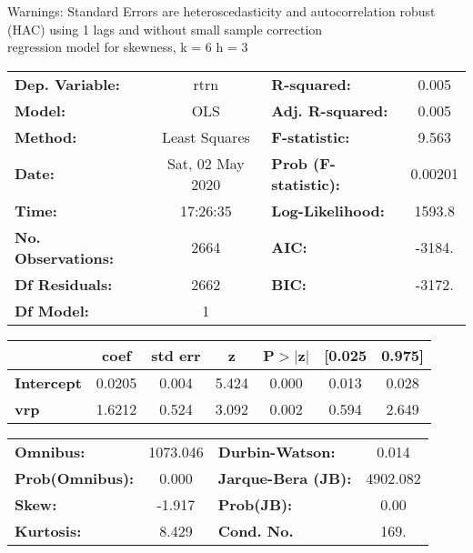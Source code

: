 Warnings: \newline
 [1] Standard Errors are heteroscedasticity and autocorrelation robust (HAC) using 1 lags and without small sample correction\\ 

regression model for skewness, k = 6 h = 3\begin{center}
\begin{tabular}{lclc}
\toprule
\textbf{Dep. Variable:}    &       rtrn       & \textbf{  R-squared:         } &     0.005   \\
\textbf{Model:}            &       OLS        & \textbf{  Adj. R-squared:    } &     0.005   \\
\textbf{Method:}           &  Least Squares   & \textbf{  F-statistic:       } &     9.563   \\
\textbf{Date:}             & Sat, 02 May 2020 & \textbf{  Prob (F-statistic):} &  0.00201    \\
\textbf{Time:}             &     17:26:35     & \textbf{  Log-Likelihood:    } &    1593.8   \\
\textbf{No. Observations:} &        2664      & \textbf{  AIC:               } &    -3184.   \\
\textbf{Df Residuals:}     &        2662      & \textbf{  BIC:               } &    -3172.   \\
\textbf{Df Model:}         &           1      & \textbf{                     } &             \\
\bottomrule
\end{tabular}
\begin{tabular}{lcccccc}
                   & \textbf{coef} & \textbf{std err} & \textbf{z} & \textbf{P$> |$z$|$} & \textbf{[0.025} & \textbf{0.975]}  \\
\midrule
\textbf{Intercept} &       0.0205  &        0.004     &     5.424  &         0.000        &        0.013    &        0.028     \\
\textbf{vrp}       &       1.6212  &        0.524     &     3.092  &         0.002        &        0.594    &        2.649     \\
\bottomrule
\end{tabular}
\begin{tabular}{lclc}
\textbf{Omnibus:}       & 1073.046 & \textbf{  Durbin-Watson:     } &    0.014  \\
\textbf{Prob(Omnibus):} &   0.000  & \textbf{  Jarque-Bera (JB):  } & 4902.082  \\
\textbf{Skew:}          &  -1.917  & \textbf{  Prob(JB):          } &     0.00  \\
\textbf{Kurtosis:}      &   8.429  & \textbf{  Cond. No.          } &     169.  \\
\bottomrule
\end{tabular}
\end{center}

